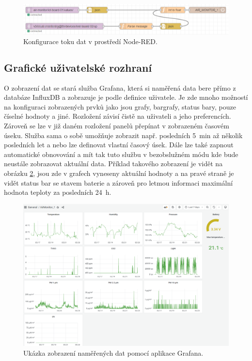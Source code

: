 \begin{figure}
    \centering
    \includegraphics[width=\textwidth]{obrazky/nodered.png}
    \caption{Konfigurace toku dat v prostředí Node-RED.}
    \label{fig_NodeRED}
\end{figure}

\subsection{Grafické uživatelské rozhraní}

O zobrazení dat se stará služba Grafana, která si naměřená data bere přímo z databáze InfluxDB a zobrazuje je podle definice uživatele. Je zde mnoho možností na konfiguraci zobrazených prvků jako jsou grafy, bargrafy, status bary, pouze číselné hodnoty a jiné. Rozložení závisí čistě na uživateli a jeho preferencích. Zároveň se lze v již daném rozložení panelů přepínat v zobrazeném časovém úseku. Služba sama o sobě umožňuje zobrazit např. posledních \SI{5}{\minute} až několik posledních let a nebo lze definovat vlastní časový úsek. Dále lze také zapnout automatické obnovování a mít tak tuto službu v bezobslužném módu kde bude neustále zobrazovat aktuální data. Příklad takového zobrazení je vidět na obrázku \ref{fig_Grafana}, jsou zde v grafech vyneseny aktuální hodnoty a na pravé straně je vidět status bar se stavem baterie a zároveň pro letmou informaci maximální hodnota teploty za posledních \SI{24}{\hour}.

\begin{figure}[h]
    \centering
    \includegraphics[width=\textwidth]{obrazky/grafana.png}
    \caption{Ukázka zobrazení naměřených dat pomocí aplikace Grafana.}
    \label{fig_Grafana}
\end{figure}